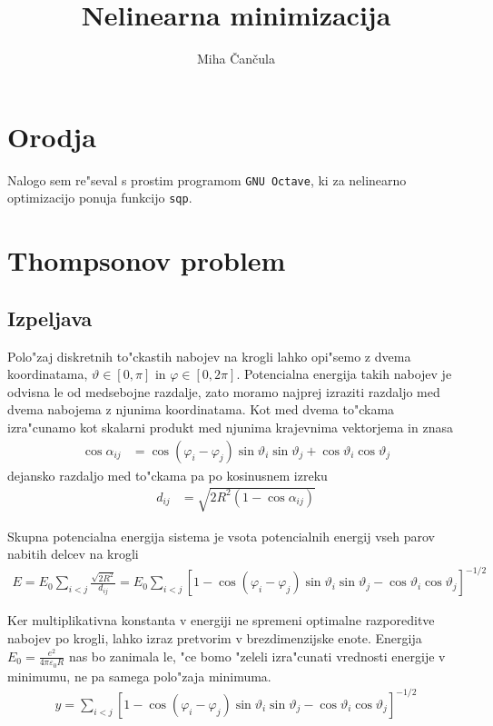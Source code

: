 \documentclass[a4paper,10pt]{article}
\title{Nelinearna minimizacija}
\author{Miha \v Can\v cula}
\renewcommand{\phi}{\varphi}
\renewcommand{\theta}{\vartheta}
\begin{document}
\maketitle

\section{Orodja}
Nalogo sem re"seval s prostim programom \texttt{GNU Octave}, ki za nelinearno optimizacijo ponuja funkcijo \texttt{sqp}. 

\section{Thompsonov problem}
\subsection{Izpeljava}
Polo"zaj diskretnih to"ckastih nabojev na krogli lahko opi"semo z dvema koordinatama, $\theta\in[0,\pi]$ in $\phi\in[0,2\pi]$. Potencialna energija takih nabojev je odvisna le od medsebojne razdalje, zato moramo najprej izraziti razdaljo med dvema nabojema z njunima koordinatama. Kot med dvema to"ckama izra"cunamo kot skalarni produkt med njunima krajevnima vektorjema in znasa
\begin{align}
  \cos \alpha_{ij} &= \cos (\phi_i-\phi_j) \sin \theta_i \sin \theta_j + \cos \theta_i \cos\theta_j
\end{align}
dejansko razdaljo med to"ckama pa po kosinusnem izreku
\begin{align}
  d_{ij} &= \sqrt{2R^2(1 - \cos\alpha_{ij})}
\end{align}

Skupna potencialna energija sistema je vsota potencialnih energij vseh parov nabitih delcev na krogli
\begin{align}
  E = E_0 \sum_{i<j} \frac{\sqrt{2R^2}}{d_{ij}} = E_0 \sum_{i<j} \left[ 1 - \cos (\phi_i-\phi_j) \sin \theta_i \sin \theta_j - \cos \theta_i \cos\theta_j \right]^{-1/2} 
\end{align}

Ker multiplikativna konstanta v energiji ne spremeni optimalne razporeditve nabojev po krogli, lahko izraz pretvorim v brezdimenzijske enote. Energija $E_0 = \frac{e^2}{4\pi\varepsilon_0 R}$ nas bo zanimala le, "ce bomo "zeleli izra"cunati vrednosti energije v minimumu, ne pa samega polo"zaja minimuma. 
\begin{align}
  y = \sum_{i<j} \left[ 1 - \cos (\phi_i-\phi_j) \sin \theta_i \sin \theta_j - \cos \theta_i \cos\theta_j\right]^{-1/2} 
\end{align}
\end{document}
